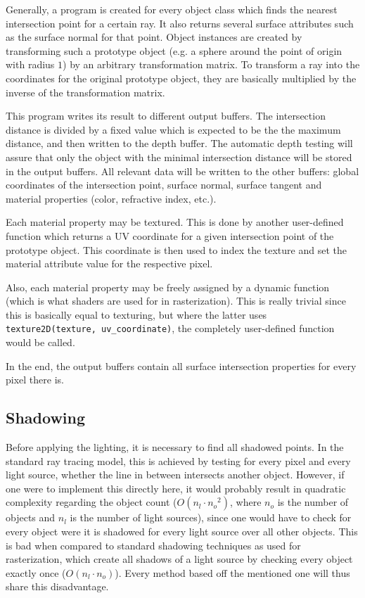 \documentclass[english,fleqn,10pt,twocolumn]{article}
\begin{document}
Generally, a program is created for every object class which finds the nearest intersection point for a certain ray. It also returns several surface attributes such as the surface normal for that point. Object instances are created by
transforming such a prototype object (e.g. a sphere around the point of origin with radius $1$) by an arbitrary transformation matrix. To transform a ray into the coordinates for the original prototype object, they are basically
multiplied by the inverse of the transformation matrix.

This program writes its result to different output buffers. The intersection distance is divided by a fixed value which is expected to be the the maximum distance, and then written to the depth buffer. The automatic depth testing will
assure that only the object with the minimal intersection distance will be stored in the output buffers. All relevant data will be written to the other buffers: global coordinates of the intersection point, surface normal, surface
tangent and material properties (color, refractive index, etc.).

Each material property may be textured. This is done by another user-defined function which returns a UV coordinate for a given intersection point of the prototype object. This coordinate is then used to index the texture and set the
material attribute value for the respective pixel.

Also, each material property may be freely assigned by a dynamic function (which is what shaders are used for in rasterization). This is really trivial since this is basically equal to texturing, but where the latter uses
{\tt texture2D(texture, uv\_coordinate)}, the completely user-defined function would be called.

In the end, the output buffers contain all surface intersection properties for every pixel there is.

\subsection{Shadowing}

Before applying the lighting, it is necessary to find all shadowed points. In the standard ray tracing model, this is achieved by testing for every pixel and every light source, whether the line in between intersects another object.
However, if one were to implement this directly here, it would probably result in quadratic complexity regarding the object count ($O(n_l \cdot {n_o}^2)$, where $n_o$ is the number of objects and $n_l$ is the number of light sources),
since one would have to check for every object were it is shadowed for every light source over all other objects. This is bad when compared to standard shadowing techniques as used for rasterization, which create all shadows of a light
source by checking every object exactly once ($O(n_l \cdot n_o)$). Every method based off the mentioned one will thus share this disadvantage.
\end{document}
